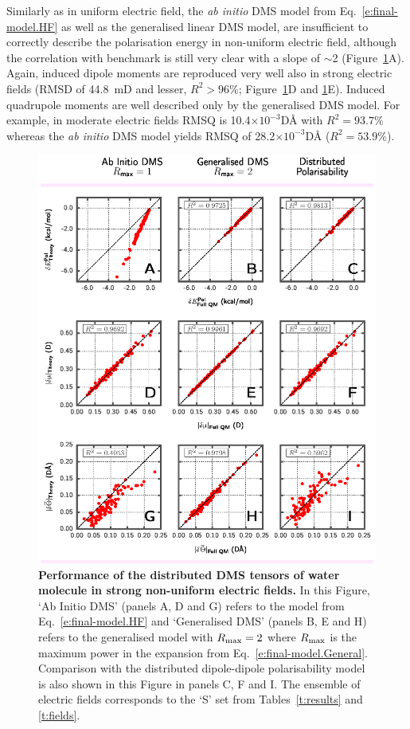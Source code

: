 \documentclass[aip,amsmath,amssymb,reprint,floatfix]{revtex4-1}
\begin{document}
Similarly as in uniform electric field, 
the \emph{ab initio} DMS model from Eq.~\eqref{e:final-model.HF} 
as well as the generalised linear DMS model, are insufficient to correctly describe the polarisation energy 
in non\hyp{}uniform electric field, although the correlation with benchmark is still very clear with a slope of $\sim$2
(Figure~\ref{f:fig-2}A). Again, induced dipole moments are reproduced very well also
in strong electric fields (RMSD of 44.8~mD and lesser, $R^2>96\%$; Figure~\ref{f:fig-2}D and \ref{f:fig-2}E).
Induced quadrupole moments are well described only by the generalised DMS model.
For example, in moderate electric fields RMSQ is 10.4$\times 10^{-3}$D\AA{ }with $R^2=93.7\%$
whereas the \emph{ab initio} DMS model yields RMSQ of 28.2$\times 10^{-3}$D\AA{ }($R^2=53.9\%$).

\begin{figure}[h]
\includegraphics[width=\textwidth]{fig-2.eps}
\caption{\label{f:fig-2} {\bf Performance of the distributed DMS tensors of water molecule in strong
non\hyp{}uniform electric fields.}
In this Figure, `Ab Initio DMS' (panels A, D and G) 
refers to the model from Eq.~\eqref{e:final-model.HF} and
`Generalised DMS' (panels B, E and H) 
refers to the generalised model with $R_{\rm max}=2$ 
where $R_{\rm max}$ is the maximum power
in the expansion from Eq.~\eqref{e:final-model.General}.
Comparison with the distributed dipole\hyp{}dipole polarisability model 
is also shown in this Figure in panels C, F and I. 
The ensemble of electric fields corresponds to the `S' set
from Tables~\ref{t:results} and \ref{t:fields}.}
\end{figure}
\end{document}
